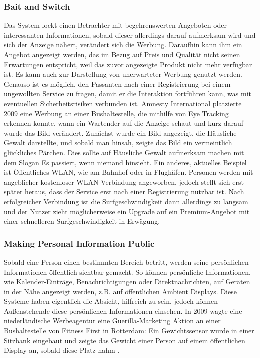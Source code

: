 \documentclass[a4paper]{article}
\begin{document}
\subsubsection{Bait and Switch}
Das System lockt einen Betrachter mit begehrenswerten Angeboten oder interessanten Informationen, sobald dieser allerdings darauf aufmerksam wird und sich der Anzeige nähert, verändert sich die Werbung. Daraufhin kann ihm ein Angebot angezeigt werden, das im Bezug auf Preis und Qualität nicht seinen Erwartungen entspricht, weil das zuvor angezeigte Produkt nicht mehr verfügbar ist. Es kann auch zur Darstellung von unerwarteter Werbung genutzt werden. Genauso ist es möglich, den Passanten nach einer Registrierung bei einem ungewollten Service zu fragen, damit er die Interaktion fortführen kann, was mit eventuellen Sicherheitsrisiken verbunden ist.\newline
Amnesty International platzierte 2009 eine Werbung an einer Bushaltestelle, die mithilfe von Eye Tracking erkennen konnte, wann ein Wartender auf die Anzeige schaut und kurz darauf wurde das Bild verändert. Zunächst wurde ein Bild angezeigt, die Häusliche Gewalt darstellte, und sobald man hinsah, zeigte das Bild ein vermeintlich glückliches Pärchen. Dies sollte auf Häusliche Gewalt aufmerksam machen mit dem Slogan \glqq Es passiert, wenn niemand hinsieht.\grqq{} \cite{amnesty_international}
Ein anderes, aktuelles Beispiel ist Öffentliches WLAN, wie am Bahnhof oder in Flughäfen. Personen werden mit angeblicher kostenloser WLAN-Verbindung angeworben, jedoch stellt sich erst später heraus, dass der Service erst nach einer Registrierung nutzbar ist. Nach erfolgreicher Verbindung ist die Surfgeschwindigkeit dann allerdings zu langsam und der Nutzer zieht möglicherweise ein Upgrade auf ein Premium-Angebot mit einer schnelleren Surfgeschwindigkeit in Erwägung.

\subsubsection{Making Personal Information Public}
Sobald eine Person einen bestimmten Bereich betritt, werden seine persönlichen Informationen öffentlich sichtbar gemacht. So können persönliche Informationen, wie Kalender-Einträge, Benachrichtigungen oder Direktnachrichten, auf Geräten in der Nähe angezeigt werden, z.B. auf öffentlichen \glqq Ambient Displays\grqq{}. Diese Systeme haben eigentlich die Absicht, hilfreich zu sein, jedoch können Außenstehende diese persönlichen Informationen einsehen.\newline
In 2009 wagte eine niederländische Werbeagentur eine Guerilla-Marketing Aktion an einer Bushaltestelle von Fitness First in Rotterdam: Ein Gewichtssensor wurde in einer Sitzbank eingebaut und zeigte das Gewicht einer Person auf einem öffentlichen Display an, sobald diese Platz nahm \cite{fitness_first}.
\end{document}
